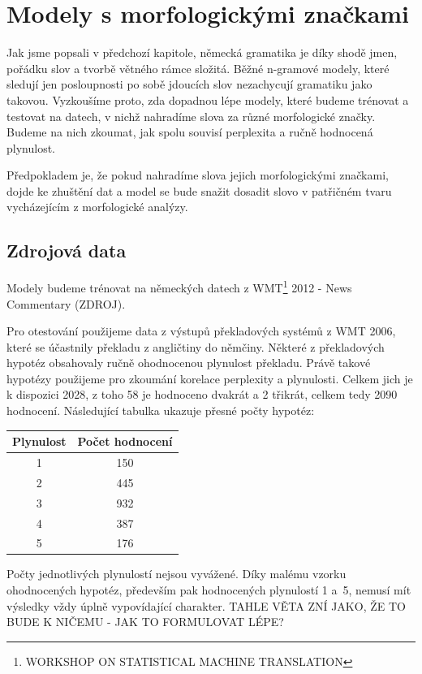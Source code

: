 \documentclass[12pt,a4paper]{report}
\begin{document}
\chapter{Modely s morfologickými značkami}
Jak jsme popsali v předchozí kapitole, německá gramatika je díky shodě jmen, pořádku slov a tvorbě větného rámce složitá. Běžné n-gramové modely, které sledují jen posloupnosti po sobě jdoucích slov nezachycují gramatiku jako takovou. Vyzkoušíme proto, zda dopadnou lépe modely, které budeme trénovat a testovat na datech, v nichž nahradíme slova za různé morfologické značky. Budeme na nich zkoumat, jak spolu souvisí perplexita a ručně hodnocená plynulost.

Předpokladem je, že pokud nahradíme slova jejich morfologickými značkami, dojde ke zhuštění dat a model se bude snažit dosadit slovo v patřičném tvaru vycházejícím z morfologické analýzy.

\section{Zdrojová data}
Modely budeme trénovat na německých datech z WMT\footnote{WORKSHOP ON STATISTICAL MACHINE TRANSLATION} 2012 - News Commentary (ZDROJ).

Pro otestování použijeme data z výstupů překladových systémů z WMT 2006, které se účastnily překladu z angličtiny do němčiny. Některé z překladových hypotéz obsahovaly ručně ohodnocenou plynulost překladu. Právě takové hypotézy použijeme pro zkoumání korelace perplexity a plynulosti. Celkem jich je k dispozici 2028, z toho 58 je hodnoceno dvakrát a 2 třikrát, celkem tedy 2090 hodnocení. Následující tabulka ukazuje přesné počty hypotéz:

\begin{center}\begin{tabular}{|c|c|}
	\hline
	\textbf{Plynulost} & \textbf{Počet hodnocení}\\
	\hline
	1 & 150\\
	\hline
	2 & 445\\
	\hline
	3 & 932\\
	\hline
	4 & 387\\
	\hline
	5 & 176\\
	\hline
\end{tabular}\end{center}


Počty jednotlivých plynulostí nejsou vyvážené. Díky malému vzorku ohodnocených hypotéz, především pak hodnocených plynulostí 1 a~5, nemusí mít výsledky vždy úplně vypovídající charakter. TAHLE VĚTA ZNÍ JAKO, ŽE TO BUDE K NIČEMU - JAK TO FORMULOVAT LÉPE?
\end{document}

